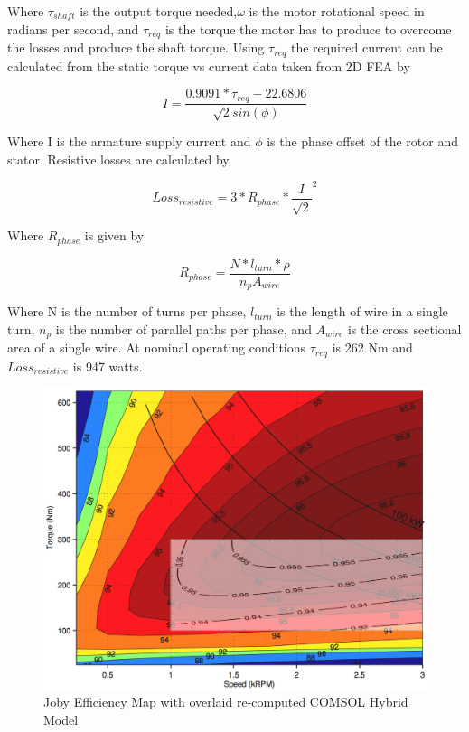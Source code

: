 \documentclass[]{aiaa-tc}%
\begin{document}
Where $\tau_{shaft}$ is the output torque needed,$\omega$ is the motor rotational speed in radians per second, and $\tau_{req}$ is the torque the motor has to produce to overcome the losses and produce the shaft torque. Using $\tau_{req}$ the required current can be calculated from the static torque vs current data taken from 2D FEA by

\begin{equation}
I = \frac{0.9091*\tau_{req}-22.6806}{\sqrt{2}sin(\phi)}
\label{eq:CurrentLoss}
\end{equation}

Where I is the armature supply current and $\phi$ is the phase offset of the rotor and stator.
Resistive losses are calculated by 

\begin{equation}
Loss_{resistive} =3*R_{phase}*\frac{I}{\sqrt{2}}^{2}
\label{eq:ResLoss}
\end{equation}

Where $R_{phase}$ is given by 

\begin{equation}
R_{phase} =\frac{N*l_{turn}*\rho}{n_{p}A_{wire}}
\label{eq:Rphase}
\end{equation}

Where N is the number of turns per phase, $l_{turn}$ is the length of wire in a single turn, $n_{p}$ is the number of parallel paths per phase, and $A_{wire}$ is the cross sectional area of a single wire.
At nominal operating conditions $\tau_{req}$ is 262 Nm and $Loss_{resistive}$ is 947 watts. 

\begin{figure}[!htb]%
	\centering
    \includegraphics[width=1.0\textwidth]{figures/map_compare.png}
	\caption{Joby Efficiency Map with overlaid re-computed COMSOL Hybrid Model}
	\label{fig:map}
\end{figure}
\end{document}
